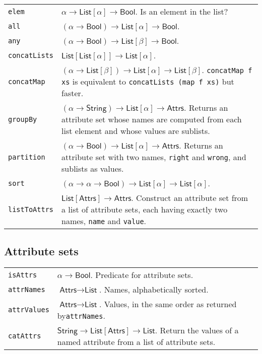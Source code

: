 \documentclass[9pt, a4paper, landscape]{extarticle}
\newcommand{\cmd}[1]{\texttt{#1}}
\newcommand{\str}{\textsf{String}}
\newcommand{\lst}{\textsf{List}}
\newcommand{\ats}{\textsf{Attrs}}
\newcommand{\bln}{\textsf{Bool}}
\begin{document}
\begin{multicols*}{3}
\begin{tabularx}{\columnwidth}{@{}l>{\raggedright\arraybackslash}X@{}}
  \cmd{elem}        & $\alpha\to\lst[\alpha]\to\bln$. Is an element in the list? \\
  \cmd{all}         & $(\alpha \to \bln) \to \lst[\alpha] \to \bln$. \\
  \cmd{any}         & $(\alpha \to \bln) \to \lst[\beta] \to \bln$. \\ 
  
  \cmd{concatLists} & $\lst[\lst[\alpha]]\to\lst[\alpha]$.\\
  \cmd{concatMap}   & $(\alpha\to\lst[\beta])\to\lst[\alpha]\to\lst[\beta]$. \cmd{concatMap f
    xs} is equivalent to \cmd{concatLists (map f xs)} but faster. \\

  \cmd{groupBy}     & $(\alpha\to\str)\to\lst[\alpha]\to\ats$. Returns an attribute
  set whose names are computed from each list element and whose values
  are sublists. \\
  \cmd{partition}   & $(\alpha\to\bln)\to\lst[\alpha]\to\ats$. Returns an attribute set
  with two names, \cmd{right} and \cmd{wrong}, and sublists as values. \\

  \cmd{sort}        & $(\alpha\to\alpha\to\bln)\to\lst[\alpha]\to\lst[\alpha]$. \\

  \cmd{listToAttrs} & $\lst[\ats]\to\ats$. Construct an attribute set
  from a list of attribute sets, each having exactly two names,
  \cmd{name} and \cmd{value}. \\
\end{tabularx}

\subsection*{Attribute sets}
\begin{tabularx}{\columnwidth}{@{}l>{\raggedright\arraybackslash}X@{}}
  \cmd{isAttrs} & $\alpha\to\bln$. Predicate for attribute sets. \\

  \cmd{attrNames} & $\ats \to \lst$. Names, alphabetically sorted. \\

  \cmd{attrValues} & $\ats \to \lst$. Values, in the same order as
  returned by\cmd{attrNames}. \\

  \cmd{catAttrs} & $\str \to \lst[\ats] \to \lst$. Return the values of a
  named attribute from a list of attribute sets. \\


\end{tabularx}
\end{multicols*}
\end{document}
